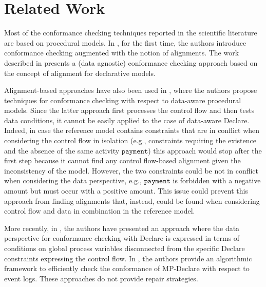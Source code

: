 \section{Related Work}
\label{sec:related}

Most of the conformance checking techniques reported in the scientific literature are based on procedural models. In \cite{DBLP:conf/edoc/AdriansyahDA11}, for the first time, the authors introduce conformance checking augmented with the notion of alignments. The work described in \cite{LeoniMA12} presents a (data agnostic) conformance checking approach based on the concept of alignment for declarative models.

Alignment-based approaches have also been used in \cite{MultiPerspective}, where the authors propose techniques for conformance checking with respect to data-aware procedural models. Since the latter approach first processes the control flow and then tests data conditions, it cannot be easily applied to the case of data-aware Declare. Indeed, in case the reference model contains constraints that are in conflict when considering the control flow in isolation (e.g., constraints requiring the existence and the absence of the same activity $\texttt{payment}$) this approach would stop after the first step because it cannot find any control flow-based alignment given the inconsistency of the model. However, the two constraints could be not in conflict when considering the data perspective, e.g., $\texttt{payment}$ is forbidden with a negative amount but must occur with a positive amount. This issue could prevent this approach from finding alignments that, instead, could be found when considering control flow and data in combination in the reference model.

More recently, in \cite{Borrego014}, the authors have presented an approach where the data perspective for conformance checking with Declare is expressed in terms of conditions on global process variables disconnected from the specific Declare constraints expressing the control flow. In \cite{BurattinMS16}, the authors provide an algorithmic framework to efficiently check the conformance of MP-Declare with respect to event logs. These approaches do not provide repair strategies. 